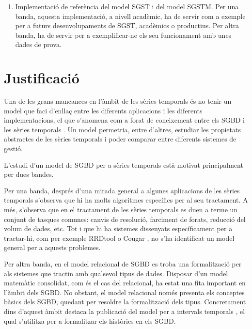 \begin{enumerate}
\item Implementació de referència del model SGST i del model
  SGSTM. Per una banda, aquesta implementació, a nivell acadèmic, ha
  de servir com a exemple per a futurs desenvolupaments de SGST,
  acadèmics o productius. Per altra banda, ha de servir per a
  exemplificar-ne els seu funcionament amb unes dades de prova.



\end{enumerate}






\section{Justificació}

Una de les grans mancances en l'àmbit de les sèries temporals és no
tenir un model que faci d'enllaç entre les diferents aplicacions i les
diferents implementacions, el que s'anomena com a forat de coneixement
entre els SGBD i les sèries
temporals \parencite{zhang11,stonebraker09:scidb}. Un model permetria,
entre d'altres, estudiar les propietats abstractes de les sèries
temporals i poder comparar entre diferents sistemes de gestió.



L'estudi d'un model de SGBD per a sèries temporals està motivat
principalment per dues bandes.


Per una banda, després d'una mirada general a algunes aplicacions de
les sèries temporals s'observa que hi ha molts algoritmes específics
per al seu tractament. A més, s'observa que en el tractament de les
sèries temporals es duen a terme un conjunt de tasques comunes: canvis
de resolució, farciment de forats, reducció del volum de dades, etc.
Tot i que hi ha sistemes dissenyats específicament per a tractar-hi,
com per exemple RRDtool \parencite{rrdtool} o
Cougar \parencite{fung02}, no s'ha identificat un model general per a
aquests problemes.

Per altra banda, en el model relacional de SGBD es troba una
formalització per als sistemes que tractin amb qualsevol tipus de
dades. Disposar d'un model matemàtic consolidat, com és el cas del
relacional, ha estat una fita important en l'àmbit dels SGBD.  No
obstant, el model relacional només presenta els conceptes bàsics dels
SGBD, quedant per resoldre la formalització dels tipus. Concretament
dins d'aquest àmbit destaca la publicació del model per a intervals
temporals \parencite{date02:_tempor_data_relat_model}, el qual
s'utilitza per a formalitzar els històrics en els SGBD.

